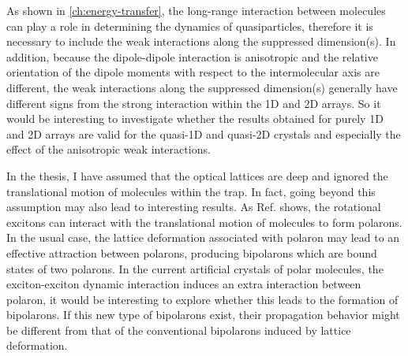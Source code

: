 As shown in \autoref{ch:energy-transfer}, the long-range interaction between molecules can play a role in determining
the dynamics of quasiparticles, therefore it is necessary to include the weak interactions along the suppressed dimension(s). 
In addition, because the dipole-dipole interaction is anisotropic and the relative orientation of the dipole moments with respect to the intermolecular axis are different, the weak interactions along the suppressed dimension(s) generally have different signs from the strong interaction within the 1D and 2D arrays. So it would be interesting to investigate whether the results obtained for purely 1D and 2D arrays are valid for the quasi-1D and quasi-2D crystals and especially the effect of 
the anisotropic weak interactions. 


 In the thesis, 
I have assumed that the optical lattices are deep and ignored the translational motion of molecules within the trap. In fact,
going beyond this assumption may also lead to interesting results. 
As Ref. \cite{felipe-polarons} shows, the rotational excitons can interact with the translational motion of molecules to
form polarons. In the usual case, the lattice deformation associated with polaron may lead to an effective attraction 
between polarons, producing bipolarons which are bound states of two polarons.  In the current artificial crystals of polar 
molecules, the exciton-exciton dynamic interaction induces an extra interaction between polaron, it would be interesting to
explore whether this leads to the formation of bipolarons. If this new type of bipolarons exist, their propagation behavior 
might be different from that of the conventional bipolarons induced by lattice deformation.




